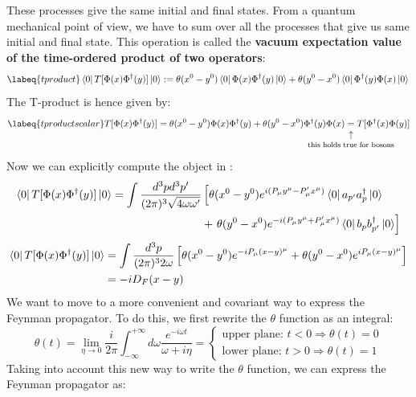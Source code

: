 \documentclass[../main.tex]{subfiles}
\begin{document}
These processes give the same initial and final states. From a quantum mechanical point of view, we have to sum over all the processes that give us same initial and final state. This operation is called the \textbf{vacuum expectation value of the time-ordered product of two operators}:
\begin{equation}
\labeq{tproduct}    
\bra{0}T[\Phi(x)\Phi^\dagger(y)]\ket{0}:=\theta(x^0-y^0)\bra{0}\Phi(x)\Phi^\dagger(y)\ket{0}+\theta(y^0-x^0)\bra{0}\Phi^\dagger(y)\Phi(x)\ket{0}\\
\end{equation}
The T-product is hence given by:
\begin{equation}
\labeq{tproductscalar}
T[\Phi(x)\Phi^\dagger(y)]=\theta(x^0-y^0)\Phi(x)\Phi^\dagger(y)+\theta(y^0-x^0)\Phi^\dagger(y)\Phi(x)\underset{\mathclap{\tikz \node {$\uparrow$} node [below=1ex] {\footnotesize this holds true for bosons };}}
=T[\Phi^\dagger(x)\Phi(y)]
\end{equation}
Now we can explicitly compute the object in :
\begin{align*}
\bra{0}T[\Phi(x)\Phi^\dagger(y)]\ket{0}=\int\frac{d^3pd^3p'}{(2\pi)^3\sqrt{4\omega\omega'}}&\left[\theta(x^0-y^0)e^{i(P_\mu y^\mu-P'_\mu x^\mu)}\bra{0}a_{p'}a^\dagger_p\ket{0}\right.\\
&+\left.\theta(y^0-x^0)e^{-i(P_\mu y^\mu+P'_\mu x^\mu)}\bra{0}b_pb^\dagger_{p'}\ket{0}\right]
\end{align*}
\begin{align*}
\bra{0}T[\Phi(x)\Phi^\dagger(y)]\ket{0}&=\int\frac{d^3p}{(2\pi)^32\omega}\left[\theta(x^0-y^0)e^{-iP_\mu(x-y)^\mu}+\theta(y^0-x^0)e^{iP_\mu(x-y)^\mu}\right]\\
&=-iD_F(x-y)
\end{align*}
We want to move to a more convenient and covariant way to express the Feynman propagator. To do this, we first rewrite the $\theta$ function as an integral:
\[
\theta(t)=\lim_{\eta\to0}\frac{i}{2\pi}\int_{-\infty}^{+\infty}d\omega\frac{e^{-i\omega t}}{\omega+i\eta}=\begin{cases}\text{upper plane: }t<0\Rightarrow\theta(t)=0\\ 
\text{lower plane: }t>0\Rightarrow\theta(t)=1
\end{cases}
\]
Taking into account this new way to write the $\theta$ function, we can express the Feynman propagator as:
\end{document}
